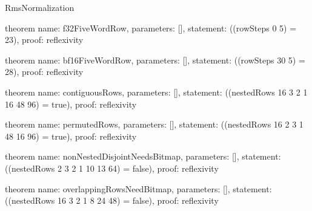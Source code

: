 \begin{lexlean}{RmsNormalization}
\begin{semanticmodule}
theorem{
  name: f32FiveWordRow,
  parameters: [],
  statement: ((rowSteps 0 5) = 23),
  proof: reflexivity{}
}

theorem{
  name: bf16FiveWordRow,
  parameters: [],
  statement: ((rowSteps 30 5) = 28),
  proof: reflexivity{}
}

theorem{
  name: contiguousRows,
  parameters: [],
  statement: ((nestedRows 16 3 2 1 16 48 96) = true),
  proof: reflexivity{}
}

theorem{
  name: permutedRows,
  parameters: [],
  statement: ((nestedRows 16 2 3 1 48 16 96) = true),
  proof: reflexivity{}
}

theorem{
  name: nonNestedDisjointNeedsBitmap,
  parameters: [],
  statement: ((nestedRows 2 3 2 1 10 13 64) = false),
  proof: reflexivity{}
}

theorem{
  name: overlappingRowsNeedBitmap,
  parameters: [],
  statement: ((nestedRows 16 3 2 1 8 24 48) = false),
  proof: reflexivity{}
}
\end{semanticmodule}
\end{lexlean}
